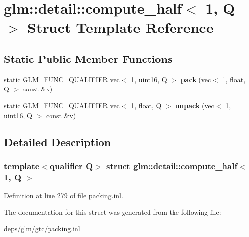 \hypertarget{structglm_1_1detail_1_1compute__half_3_011_00_01Q_01_4}{}\section{glm\+:\+:detail\+:\+:compute\+\_\+half$<$ 1, Q $>$ Struct Template Reference}
\label{structglm_1_1detail_1_1compute__half_3_011_00_01Q_01_4}
\subsection*{Static Public Member Functions}
\begin{DoxyCompactItemize}
\item 
\mbox{\label{structglm_1_1detail_1_1compute__half_3_011_00_01Q_01_4_adf3bd584754baf5ce34453bf4174a658}} 
static G\+L\+M\+\_\+\+F\+U\+N\+C\+\_\+\+Q\+U\+A\+L\+I\+F\+I\+ER \hyperlink{structglm_1_1vec}{vec}$<$ 1, uint16, Q $>$ {\bfseries pack} (\hyperlink{structglm_1_1vec}{vec}$<$ 1, float, Q $>$ const \&v)
\item 
\mbox{\label{structglm_1_1detail_1_1compute__half_3_011_00_01Q_01_4_a746beaa20b378bd4b7680b786c31e2c5}} 
static G\+L\+M\+\_\+\+F\+U\+N\+C\+\_\+\+Q\+U\+A\+L\+I\+F\+I\+ER \hyperlink{structglm_1_1vec}{vec}$<$ 1, float, Q $>$ {\bfseries unpack} (\hyperlink{structglm_1_1vec}{vec}$<$ 1, uint16, Q $>$ const \&v)
\end{DoxyCompactItemize}


\subsection{Detailed Description}
\subsubsection*{template$<$qualifier Q$>$\newline
struct glm\+::detail\+::compute\+\_\+half$<$ 1, Q $>$}



Definition at line 279 of file packing.\+inl.



The documentation for this struct was generated from the following file\+:\begin{DoxyCompactItemize}
\item 
deps/glm/gtc/\hyperlink{packing_8inl}{packing.\+inl}\end{DoxyCompactItemize}
